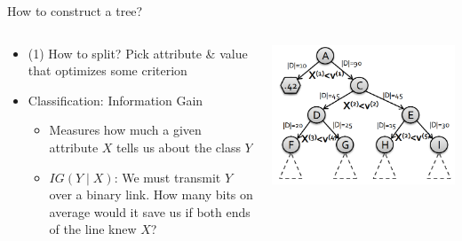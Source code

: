 \begin{frame}{How to construct a tree?}
    \begin{columns}
        \begin{column}{0.65\textwidth}
            \begin{itemize}
                \item (1) How to split? Pick attribute \& value that optimizes some criterion
                \item Classification: Information Gain
                \begin{itemize}
                    \item Measures how much a given attribute $X$ tells us about the class $Y$
                    \item $IG(Y \mid X)$: We must transmit $Y$ over a binary link. How many bits on average would it save us if both ends of the line knew $X$?
                \end{itemize}
            \end{itemize}
        \end{column}
        \begin{column}{0.35\textwidth}
            \includegraphics[width=\linewidth]{images/decision-trees/decision-trees-10.png}
        \end{column}
    \end{columns}
\end{frame}

